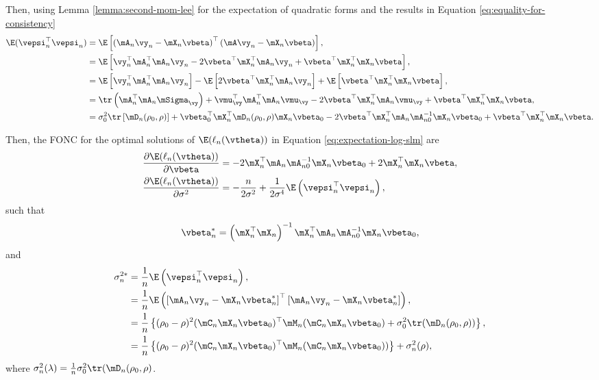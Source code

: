 \documentclass[english,12pt]{book}\usepackage[]{graphicx}\usepackage[]{xcolor}
\begin{document}
\begin{subappendices}
Then, using Lemma \ref{lemma:second-mom-lee} for the expectation of quadratic forms and the results in Equation \eqref{eq:equality-for-consistency}
\begin{equation}
\begin{aligned}
\E(\vepsi_n^\top\vepsi_n) & = \E\left[\left(\mA_n\vy_n - \mX_n\vbeta\right)^\top\left(\mA\vy_n - \mX_n\vbeta\right)\right], \\
& = \E\left[\vy_n^\top\mA_n^\top\mA_n\vy_n - 2\vbeta^\top\mX_n^\top\mA_n\vy_n + \vbeta^\top\mX_n^\top\mX_n\vbeta\right], \\
& = \E\left[\vy_n^\top\mA_n^\top\mA_n\vy_n \right]- \E\left[2\vbeta^\top\mX_n^\top\mA_n\vy_n\right] + \E\left[\vbeta^\top\mX_n^\top\mX_n\vbeta\right], \\
& = \tr\left(\mA_n^\top\mA_n\mSigma_{\vy}\right) + \vmu_{\vy}^\top\mA_n^\top\mA_n\vmu_{\vy} - 2\vbeta^\top\mX_n^\top\mA_n\vmu_{\vy} + \vbeta^\top\mX_n^\top\mX_n\vbeta, \\
& = \sigma_0^2\tr\left[\mD_n(\rho_0, \rho)\right] + \vbeta_0^\top\mX_n^\top\mD_n(\rho_0, \rho)\mX_n\vbeta_0 -2\vbeta^\top\mX_n^\top\mA_n\mA_{n0}^{-1}\mX_n\vbeta_0 + \vbeta^\top\mX_n^\top\mX_n\vbeta.
\end{aligned}
\end{equation}

Then, the FONC for the optimal solutions of $\E(\ell_n(\vtheta))$ in Equation \eqref{eq:expectation-log-slm} are 
\begin{equation*}
\begin{aligned}
\frac{\partial  \E(\ell_n(\vtheta))}{\partial \vbeta} & = -2\mX_n^\top\mA_n\mA_{n0}^{-1}\mX_n\vbeta_0 +  2\mX_n^\top\mX_n\vbeta, \\
\frac{\partial  \E(\ell_n(\vtheta))}{\partial \sigma^2} & = -\frac{n}{2\sigma^2} + \frac{1}{2\sigma^4}\E\left(\vepsi_n^\top\vepsi_n\right), 
\end{aligned}
\end{equation*}
%
such that
\begin{equation*}
\vbeta_n^*  = \left(\mX_n^\top\mX_n\right)^{-1}\mX_n^\top\mA_n\mA_{n0}^{-1}\mX_n\vbeta_0,
\end{equation*}
and 
\begin{equation}\label{eq:sigma-star-consistency}
\begin{aligned}
\sigma^{2*}_n  &  = \frac{1}{n}\E\left(\vepsi_n^\top\vepsi_n\right), \\
               & =  \frac{1}{n}\E\left(\left[\mA_n\vy_n - \mX_n\vbeta_n^*\right]^\top \left[\mA_n\vy_n - \mX_n\vbeta_n^*\right]\right), \\
               &= \frac{1}{n}\left\lbrace (\rho_0 - \rho)^2(\mC_n\mX_n\vbeta_0)^\top \mM_n(\mC_n\mX_n\vbeta_0) + \sigma_0^2\tr(\mD_n(\rho_0, \rho)) \right\rbrace, \\
               & = \frac{1}{n}\left\lbrace (\rho_0 - \rho)^2(\mC_n\mX_n\vbeta_0)^\top \mM_n(\mC_n\mX_n\vbeta_0))\right\rbrace + \sigma_n^2(\rho), 
\end{aligned}
\end{equation}
%
where $\sigma_n^2(\lambda) = \frac{1}{n}\sigma_0^2\tr(\mD_n(\rho_0, \rho)$.


\end{subappendices}
\end{document}
